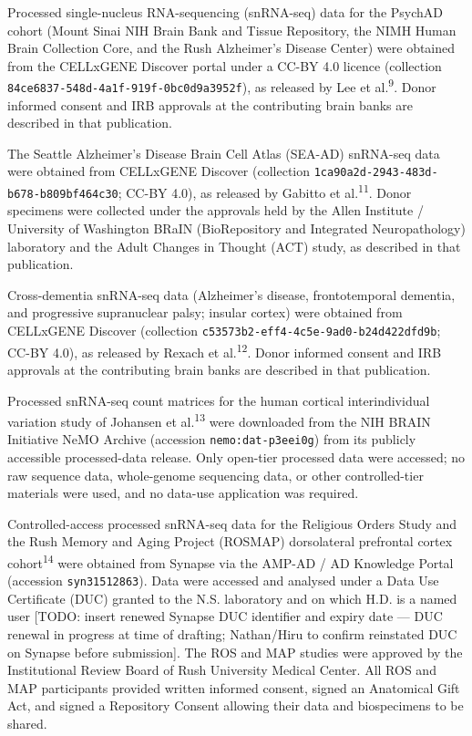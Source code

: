\documentclass[
]{article}
\begin{document}
Processed single-nucleus RNA-sequencing (snRNA-seq) data for the PsychAD
cohort (Mount Sinai NIH Brain Bank and Tissue Repository, the NIMH Human
Brain Collection Core, and the Rush Alzheimer's Disease Center) were
obtained from the CELLxGENE Discover portal under a CC-BY 4.0 licence
(collection \texttt{84ce6837-548d-4a1f-919f-0bc0d9a3952f}), as released
by Lee et al.\textsuperscript{9}. Donor informed consent and IRB
approvals at the contributing brain banks are described in that
publication.

The Seattle Alzheimer's Disease Brain Cell Atlas (SEA-AD) snRNA-seq data
were obtained from CELLxGENE Discover (collection
\texttt{1ca90a2d-2943-483d-b678-b809bf464c30}; CC-BY 4.0), as released
by Gabitto et al.\textsuperscript{11}. Donor specimens were collected
under the approvals held by the Allen Institute / University of
Washington BRaIN (BioRepository and Integrated Neuropathology)
laboratory and the Adult Changes in Thought (ACT) study, as described in
that publication.

Cross-dementia snRNA-seq data (Alzheimer's disease, frontotemporal
dementia, and progressive supranuclear palsy; insular cortex) were
obtained from CELLxGENE Discover (collection
\texttt{c53573b2-eff4-4c5e-9ad0-b24d422dfd9b}; CC-BY 4.0), as released
by Rexach et al.\textsuperscript{12}. Donor informed consent and IRB
approvals at the contributing brain banks are described in that
publication.

Processed snRNA-seq count matrices for the human cortical
interindividual variation study of Johansen et al.\textsuperscript{13}
were downloaded from the NIH BRAIN Initiative NeMO Archive (accession
\texttt{nemo:dat-p3eei0g}) from its publicly accessible processed-data
release. Only open-tier processed data were accessed; no raw sequence
data, whole-genome sequencing data, or other controlled-tier materials
were used, and no data-use application was required.

Controlled-access processed snRNA-seq data for the Religious Orders
Study and the Rush Memory and Aging Project (ROSMAP) dorsolateral
prefrontal cortex cohort\textsuperscript{14} were obtained from Synapse
via the AMP-AD / AD Knowledge Portal (accession \texttt{syn31512863}).
Data were accessed and analysed under a Data Use Certificate (DUC)
granted to the N.S. laboratory and on which H.D. is a named user
{[}TODO: insert renewed Synapse DUC identifier and expiry date --- DUC
renewal in progress at time of drafting; Nathan/Hiru to confirm
reinstated DUC on Synapse before submission{]}. The ROS and MAP studies
were approved by the Institutional Review Board of Rush University
Medical Center. All ROS and MAP participants provided written informed
consent, signed an Anatomical Gift Act, and signed a Repository Consent
allowing their data and biospecimens to be shared.
\end{document}
